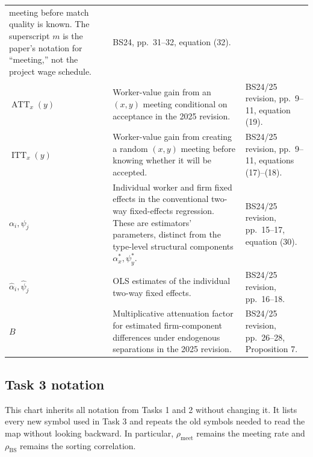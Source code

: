 \documentclass[11pt]{article}
\begin{document}
\begin{longtable}{p{}p{}p{}}
meeting before match quality is known.  The superscript \(m\) is the paper's
notation for ``meeting,'' not the project wage schedule. & BS24, pp.\ 31--32,
equation (32). \\
\(\operatorname{ATT}_x(y)\) & Worker-value gain from an \((x,y)\) meeting
conditional on acceptance in the 2025 revision. & BS24/25 revision,
pp.\ 9--11, equation (19). \\
\(\operatorname{ITT}_x(y)\) & Worker-value gain from creating a random
\((x,y)\) meeting before knowing whether it will be accepted. & BS24/25
revision, pp.\ 9--11, equations (17)--(18). \\
\(\alpha_i,\psi_j\) & Individual worker and firm fixed effects in the
conventional two-way fixed-effects regression.  These are estimators'
parameters, distinct from the type-level structural components
\(\alpha_x^*,\psi_y^*\). & BS24/25 revision, pp.\ 15--17,
equation (30). \\
\(\widehat\alpha_i,\widehat\psi_j\) & OLS estimates of the individual
two-way fixed effects. & BS24/25 revision, pp.\ 16--18. \\
\(B\) & Multiplicative attenuation factor for estimated firm-component
differences under endogenous separations in the 2025 revision. & BS24/25
revision, pp.\ 26--28, Proposition 7. \\
\end{longtable}
\subsection{Task 3 notation}

This chart inherits all notation from Tasks 1 and 2 without changing it.  It
lists every new symbol used in Task 3 and repeats the old symbols needed to
read the map without looking backward.  In particular,
\(\rho_{\mathrm{meet}}\) remains the meeting rate and
\(\rho_{\mathrm{BS}}\) remains the sorting correlation.
\end{document}
